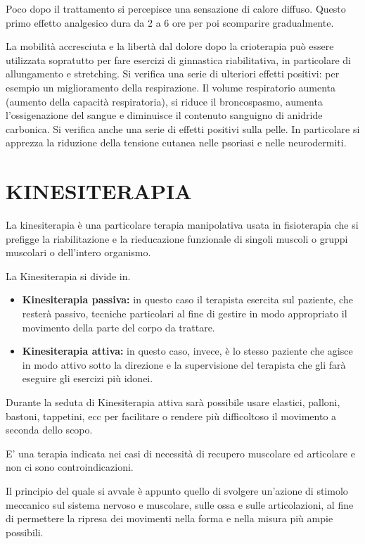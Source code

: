   Poco dopo il trattamento si percepisce una sensazione di calore
  diffuso. Questo primo effetto analgesico dura da 2 a 6 ore per poi
  scomparire gradualmente.

  La mobilità accresciuta e la libertà dal dolore dopo la crioterapia
  può essere utilizzata sopratutto per fare esercizi di ginnastica
  riabilitativa, in particolare di allungamento e stretching. Si
  verifica una serie di ulteriori effetti positivi: per esempio un
  miglioramento della respirazione. Il volume respiratorio aumenta
  (aumento della capacità respiratoria), si riduce il broncospasmo,
  aumenta l'ossigenazione del sangue e diminuisce il contenuto sanguigno
  di anidride carbonica. Si verifica anche una serie di effetti positivi
  sulla pelle. In particolare si apprezza la riduzione della tensione
  cutanea nelle psoriasi e nelle neurodermiti.


 
\section{KINESITERAPIA}

 

La kinesiterapia è una particolare terapia manipolativa usata in
fisioterapia che si prefigge la riabilitazione e la rieducazione
funzionale di singoli muscoli o gruppi muscolari o dell'intero
organismo.

La Kinesiterapia si divide in.

\begin{itemize}
\item
  \textbf{Kinesiterapia passiva:} in questo caso il terapista esercita
  sul paziente, che resterà passivo, tecniche particolari al fine di
  gestire in modo appropriato il movimento della parte del corpo da
  trattare.
\item
  \textbf{Kinesiterapia attiva:} in questo caso, invece, è lo stesso
  paziente che agisce in modo attivo sotto la direzione e la
  supervisione del terapista che gli farà eseguire gli esercizi più
  idonei.
\end{itemize}

Durante la seduta di Kinesiterapia attiva sarà possibile usare elastici,
palloni, bastoni, tappetini, ecc per facilitare o rendere più
difficoltoso il movimento a seconda dello scopo.

E' una terapia indicata nei casi di necessità di recupero muscolare ed
articolare e non ci sono controindicazioni.

Il principio del quale si avvale è appunto quello di svolgere un'azione
di stimolo meccanico sul sistema nervoso e muscolare, sulle ossa e sulle
articolazioni, al fine di permettere la ripresa dei movimenti nella
forma e nella misura più ampie possibili.

